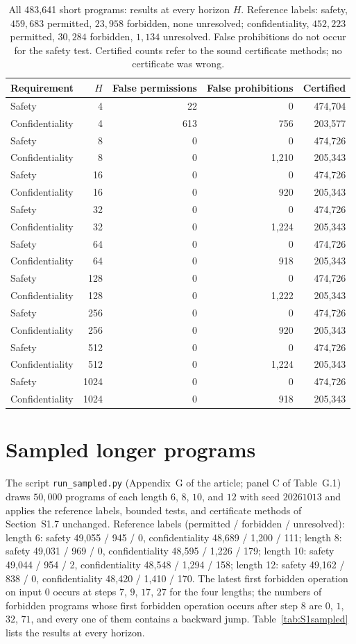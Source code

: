 \documentclass[11pt]{article}
\begin{document}
\begin{table}[tbp]\centering\small
\caption{All 483,641 short programs: results at every horizon $H$. Reference labels: safety, $459{,}683$ permitted, $23{,}958$ forbidden, none unresolved; confidentiality, $452{,}223$ permitted, $30{,}284$ forbidden, $1{,}134$ unresolved. False prohibitions do not occur for the safety test. Certified counts refer to the sound certificate methods; no certificate was wrong.}
\label{tab:S1small}
\begin{tabular}{lrrrr}
\toprule
Requirement & $H$ & False permissions & False prohibitions & Certified\\
\midrule
Safety & 4 & 22 & 0 & 474,704\\
Confidentiality & 4 & 613 & 756 & 203,577\\
Safety & 8 & 0 & 0 & 474,726\\
Confidentiality & 8 & 0 & 1,210 & 205,343\\
Safety & 16 & 0 & 0 & 474,726\\
Confidentiality & 16 & 0 & 920 & 205,343\\
Safety & 32 & 0 & 0 & 474,726\\
Confidentiality & 32 & 0 & 1,224 & 205,343\\
Safety & 64 & 0 & 0 & 474,726\\
Confidentiality & 64 & 0 & 918 & 205,343\\
Safety & 128 & 0 & 0 & 474,726\\
Confidentiality & 128 & 0 & 1,222 & 205,343\\
Safety & 256 & 0 & 0 & 474,726\\
Confidentiality & 256 & 0 & 920 & 205,343\\
Safety & 512 & 0 & 0 & 474,726\\
Confidentiality & 512 & 0 & 1,224 & 205,343\\
Safety & 1024 & 0 & 0 & 474,726\\
Confidentiality & 1024 & 0 & 918 & 205,343\\
\bottomrule
\end{tabular}
\end{table}
\section{Sampled longer programs}
The script \texttt{run\_sampled.py} (Appendix~G of the article; panel C of Table~G.1) draws $50{,}000$ programs of each length $6$, $8$, $10$, and $12$ with seed $20261013$ and applies the reference labels, bounded tests, and certificate methods of Section~S1.7 unchanged. Reference labels (permitted / forbidden / unresolved): length 6: safety 49,055 / 945 / 0, confidentiality 48,689 / 1,200 / 111; length 8: safety 49,031 / 969 / 0, confidentiality 48,595 / 1,226 / 179; length 10: safety 49,044 / 954 / 2, confidentiality 48,548 / 1,294 / 158; length 12: safety 49,162 / 838 / 0, confidentiality 48,420 / 1,410 / 170. The latest first forbidden operation on input $0$ occurs at steps $7$, $9$, $17$, $27$ for the four lengths; the numbers of forbidden programs whose first forbidden operation occurs after step $8$ are $0$, $1$, $32$, $71$, and every one of them contains a backward jump. Table~\ref{tab:S1sampled} lists the results at every horizon.
\end{document}
